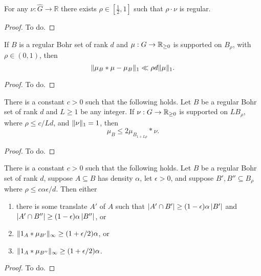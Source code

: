 \begin{lemma}
\label{bohr-regularity}
For any $\nu:\widehat{G}\to \mathbb{R}$ there exists $\rho\in[\frac{1}{2},1]$ such that $\rho\cdot \nu$ is regular.
\end{lemma}
\begin{proof}
To do.
\end{proof}

\begin{lemma}
\label{reg-conv}
If $B$ is a regular Bohr set of rank $d$ and $\mu:G\to\mathbb{R}_{\geq 0}$ is supported on $B_\rho$, with $\rho \in (0,1)$, then
\[ \lVert  \mu_B*\mu - \mu_B \rVert_{1} \ll \rho d\lVert \mu\rVert_1. \]
\end{lemma}
\begin{proof}
To do.
\end{proof}

\begin{lemma}
\label{bohr-majorise}
There is a constant $c>0$ such that the following holds.  Let $B$ be a regular Bohr set of rank $d$ and $L\geq 1$ be any integer. If $\nu:G\to\mathbb{R}_{\geq 0}$ is supported on $L B_\rho$, where $\rho \leq c/Ld$, and $\lVert \nu\rVert_1=1$, then
\[\mu_B \leq 2\mu_{B_{1+L\rho}}\ast \nu.\]
\end{lemma}
\begin{proof}
To do.
\end{proof}

\begin{lemma}
\label{bourgain-trick}
There is a constant $c>0$ such that the following holds. Let $B$ be a regular Bohr set of rank $d$, suppose $A\subseteq B$ has density $\alpha$, let $\epsilon>0$, and suppose $B',B''\subseteq B_\rho$ where $\rho\leq c\alpha\epsilon/d$. Then either
\begin{enumerate}
\item there is some translate $A'$ of $A$ such that $\left\lvert A'\cap B'\right\rvert\geq (1-\epsilon)\alpha\left\lvert B'\right\rvert$ and $\left\lvert A'\cap B''\right\rvert\geq (1-\epsilon)\alpha \left\lvert B''\right\rvert$, or
\item $\lVert 1_{A}\ast \mu_{B'}\rVert_\infty\geq (1+\epsilon/2)\alpha$, or
\item $\lVert 1_{A}\ast \mu_{B''}\rVert_\infty \geq (1+\epsilon/2)\alpha$.
\end{enumerate}
\end{lemma}
\begin{proof}
To do.
\end{proof}
